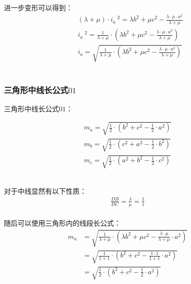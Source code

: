 \documentclass[UTF8]{ctexart}
\begin{document}
\newpage

    进一步变形可以得到：
    \begin{align}
        &(\lambda+\mu)\cdot i_a~^2=\lambda b^2+\mu c^2-\frac{\lambda\cdot\mu\cdot a^2}{\lambda+\mu}\\[4mm]
        &i_a~^2=\frac{1}{\lambda+\mu}\cdot\left(\lambda b^2+\mu c^2-\frac{\lambda\cdot\mu\cdot a^2}{\lambda+\mu}\right)\\[4mm]
        &i_a=\sqrt{\frac{1}{\lambda+\mu}\cdot\left(\lambda b^2+\mu c^2-\frac{\lambda\cdot\mu\cdot a^2}{\lambda+\mu}\right)}
    \end{align}\\

\subsubsection{三角形中线长公式$01$}
    三角形中线长公式$01$：
    \begin{large}
        \begin{align*}
            m_a=\sqrt{\frac{1}{2}\cdot\left(b^2+c^2-\frac{1}{2}\cdot a^2\right)}\\[4mm]
            m_b=\sqrt{\frac{1}{2}\cdot\left(c^2+a^2-\frac{1}{2}\cdot b^2\right)}\\[4mm]
            m_c=\sqrt{\frac{1}{2}\cdot\left(a^2+b^2-\frac{1}{2}\cdot c^2\right)}
        \end{align*}
    \end{large}\\
    对于中线显然有以下性质：
    \setcounter{equation}{0}
    \begin{align}
        \frac{DB}{DC}=\frac{\lambda}{\mu}=\frac{1}{1}
    \end{align}\\
    随后可以使用三角形内的线段长公式：\vspace{5pt}
    \begin{align}
        m_a
        &=\sqrt{\frac{1}{\lambda+\mu}\cdot\left(\lambda b^2+\mu c^2-\frac{\lambda\cdot \mu}{\lambda +\mu}\cdot a^2\right)}\\[4mm]
        &=\sqrt{\frac{1}{1+1}\cdot\left(b^2+c^2-\frac{1\cdot 1}{1+1}\cdot a^2\right)}\\[4mm]
        &=\sqrt{\frac{1}{2}\cdot\left(b^2+c^2-\frac{1}{2}\cdot a^2\right)}
    \end{align}

\newpage
\end{document}
